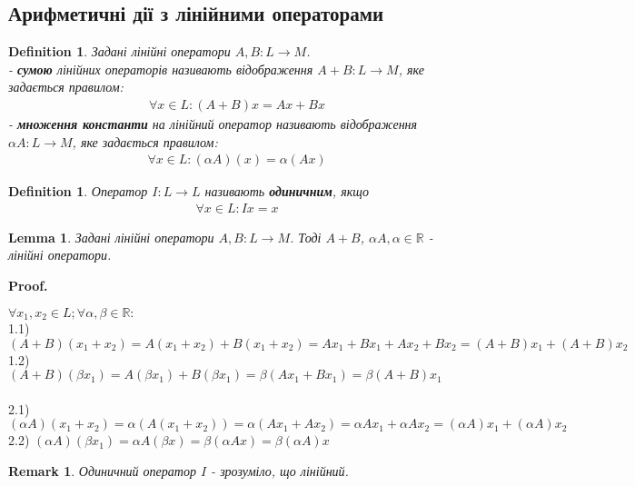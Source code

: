 \documentclass[a4paper, 10pt]{article}
\makeatletter
\def\qed{$\blacksquare$}
\theoremstyle{theoremdd}
\theoremstyle{theoremdd}
\newtheorem{definition}[theorem]{Definition}
\theoremstyle{theoremdd}
\theoremstyle{theoremdd}
\theoremstyle{theoremdd}
\theoremstyle{theoremdd}
\newtheorem{remark}[theorem]{Remark}
\theoremstyle{theoremdd}
\newtheorem{lemma}[theorem]{Lemma}
\theoremstyle{theoremdd}
\renewenvironment{proof}[1][Proof.\\]{\par
\pushQED{\hfill \qed}%
\normalfont \topsep6\p@\@plus6\p@\relax
\trivlist
\item\relax
{\bfseries
#1\@addpunct{.}}\hspace\labelsep\ignorespaces
}{%
\popQED\endtrivlist\@endpefalse
}
\makeatother
\begin{document}
	\subsection{Арифметичні дії з лінійними операторами}
	\begin{definition}
	Задані лінійні оператори $A,B: L \to M$.\\
	- \textbf{сумою} лінійних операторів називають відображення $A+B: L \to M$, яке задається правилом:
	\begin{align*}
	\forall x \in L: (A+B)x = Ax+Bx
	\end{align*}
	- \textbf{множення константи} на лінійний оператор називають відображення $\alpha A: L \to M$, яке задається правилом:
	\begin{align*}
	\forall x \in L: (\alpha A)(x) = \alpha (Ax)
	\end{align*}
	\end{definition}
	
	\begin{definition}
	Оператор $I: L \to L$ називають \textbf{одиничним}, якщо
	\begin{align*}
	\forall x \in L: Ix = x
	\end{align*}
	\end{definition}
	
	\begin{lemma}
	Задані лінійні оператори $A,B: L \to M$. Тоді $A+B$, $\alpha A, \alpha \in \mathbb{R}$ - лінійні оператори.
	\end{lemma}
	
	\begin{proof}
	$\forall x_1, x_2 \in L; \forall \alpha, \beta \in \mathbb{R}:$\\
	1.1) $(A+B)(x_1+x_2) = A(x_1+x_2)+B(x_1+x_2)=Ax_1+Bx_1+Ax_2+Bx_2=(A+B)x_1 + (A+B)x_2$\\
	1.2) $(A+B)(\beta x_1) = A(\beta x_1)+B(\beta x_1)=\beta (Ax_1+Bx_1) = \beta(A+B)x_1$\\
	\\
	2.1) $(\alpha A)(x_1+x_2) = \alpha(A(x_1+x_2))=\alpha(Ax_1 + Ax_2) = \alpha Ax_1 + \alpha Ax_2 = (\alpha A)x_1 + (\alpha A)x_2$\\
	2.2) $(\alpha A) (\beta x_1) = \alpha A(\beta x) = \beta(\alpha Ax) = \beta (\alpha A)x$
	\end{proof}
	
	\begin{remark}
	Одиничний оператор $I$ - зрозуміло, що лінійний.
	\end{remark}
	
\end{document}
